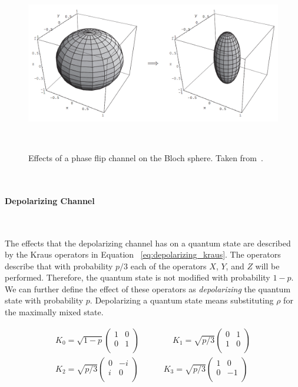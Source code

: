 \begin{figure}[h!]
  \includegraphics[scale=0.39]{figures/phase_flip.png}
  \centering
  \caption{Effects of a phase flip channel on the Bloch sphere. Taken from~\cite{nielsen_quantum_2010}.}
~\label{fig:phase_flip}
\end{figure} \

\paragraph{Depolarizing Channel} \

The effects that the depolarizing channel has on a quantum state
are described by the Kraus operators in Equation
~\ref{eq:depolarizing_kraus}. The operators describe that with
probability \(p/3\) each of the operators \(X\), \(Y\), and \(Z\)
will be performed. Therefore, the quantum state is not modified with
probability \(1-p\). We can further define the effect of these operators
as \textit{depolarizing} the quantum state with probability \(p\).
Depolarizing a quantum state means substituting \(\rho\) for the maximally
mixed state. \

\begin{equation}\label{eq:depolarizing_kraus}
  \begin{split}
    K_0 = \sqrt{1-p} \begin{pmatrix}
            1 & 0 \\
            0 & 1 \\
          \end{pmatrix} \qquad \qquad
    K_1 = \sqrt{p/3} \begin{pmatrix}
            0 & 1 \\
            1 & 0 \\
          \end{pmatrix} \\
    K_2 = \sqrt{p/3} \begin{pmatrix}
            0 & -i \\
            i & 0 \\
          \end{pmatrix}  \qquad \quad
    K_3 = \sqrt{p/3} \begin{pmatrix}
            1 & 0 \\
            0 & -1 \\
          \end{pmatrix}
  \end{split}
\end{equation} \

